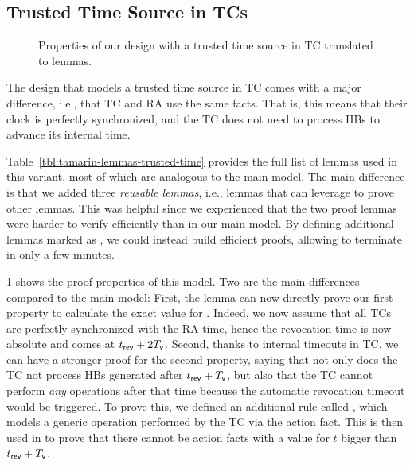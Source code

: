 \subsection{Trusted Time Source in \acp{TC}}

\begin{figure}
  \centering
    
  \caption{Properties of our design with a trusted time source in \ac{TC}
  translated to \tamarin{} lemmas.}
  \label{listing:tamarin-lemmas-time}
\end{figure}

The design that models a trusted time source in \ac{TC} comes with a major
difference, i.e., that \ac{TC} and \ac{RA} use the same  facts.
That is, this means that their clock is perfectly synchronized, and the \ac{TC}
does not need to process \acp{HB} to advance its internal time.

Table~\ref{tbl:tamarin-lemmas-trusted-time} provides the full list of lemmas
used in this variant, most of which are analogous to the main model. The main
difference is that we added three \emph{reusable lemmas}, i.e., lemmas that
\tamarin{} can leverage to prove other lemmas. This was helpful since we
experienced that the two proof lemmas were harder to verify efficiently than in
our main model. By defining additional lemmas marked as , we
could instead build efficient proofs, allowing \tamarin{} to terminate in only a
few minutes.


\cref{listing:tamarin-lemmas-time} shows the proof properties of this model. Two
are the main differences compared to the main model: First, the
 lemma can now directly prove our first property
to calculate the exact value for \paramteff. Indeed, we now assume that all
\acp{TC} are perfectly synchronized with the \ac{RA} time, hence the revocation
time is now absolute and comes at $\emph{$t_{\mathsf{rev}}$} + 2\emph{$T_{\mathsf{v}}$}$. Second, thanks to
internal timeouts in \ac{TC}, we can have a stronger proof for the second
property, saying that not only does the \ac{TC} not process \acp{HB} generated
after $\emph{$t_{\mathsf{rev}}$}{} + \emph{$T_{\mathsf{v}}$}{}$, but also that the \ac{TC} cannot perform
\emph{any} operations after that time because the automatic revocation timeout
would be triggered. To prove this, we defined an additional rule called
, which models a generic operation performed by the
\ac{TC} via the  action fact. This is then used in
 to prove that there cannot be
 action facts with a value for $t$ bigger than
$\emph{$t_{\mathsf{rev}}$} + \emph{$T_{\mathsf{v}}$}$.



